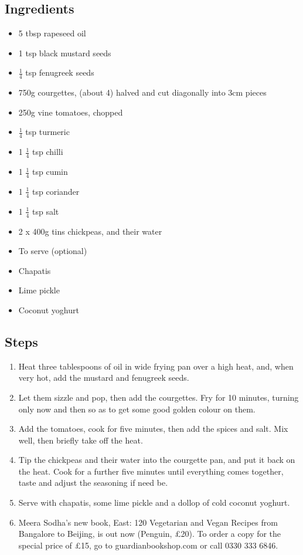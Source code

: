 \documentclass{book}
\begin{document}
\subsection*{Ingredients}
\begin{itemize}
\item 5 tbsp rapeseed oil
\item 1 tsp black mustard seeds
\item $\frac{1}{4}$ tsp fenugreek seeds
\item 750g courgettes, (about 4) halved and cut diagonally into 3cm pieces
\item 250g vine tomatoes, chopped
\item $\frac{1}{4}$ tsp turmeric
\item 1 $\frac{1}{4}$ tsp chilli
\item 1 $\frac{1}{4}$ tsp cumin
\item 1 $\frac{1}{4}$ tsp coriander
\item 1 $\frac{1}{4}$ tsp salt
\item 2 x 400g tins chickpeas, and their water
\end{itemize}

\begin{itemize}
\item To serve (optional)
\item Chapatis
\item Lime pickle
\item Coconut yoghurt
\end{itemize}

\subsection*{Steps}
\begin{enumerate}
\item Heat three tablespoons of oil in wide frying pan over a high heat, and, when very hot, add the mustard and fenugreek seeds.
\item Let them sizzle and pop, then add the courgettes. Fry for 10 minutes, turning only now and then so as to get some good golden colour on them.
\item Add the tomatoes, cook for five minutes, then add the spices and salt. Mix well, then briefly take off the heat.
\item Tip the chickpeas and their water into the courgette pan, and put it back on the heat. Cook for a further five minutes until everything comes together, taste and adjust the seasoning if need be.
\item Serve with chapatis, some lime pickle and a dollop of cold coconut yoghurt.
\item Meera Sodha’s new book, East: 120 Vegetarian and Vegan Recipes from Bangalore to Beijing, is out now (Penguin, £20). To order a copy for the special price of £15, go to guardianbookshop.com or call 0330 333 6846.
\end{enumerate}
\newpage
\end{document}
